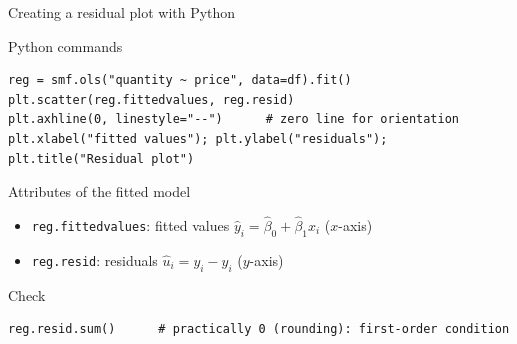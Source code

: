 \documentclass[aspectratio=169,11pt]{beamer}
\begin{document}
\begin{frame}[fragile]{Creating a residual plot with Python}
  \vspace{-8pt}
  \begin{block}{Python commands}
\begin{lstlisting}
reg = smf.ols("quantity ~ price", data=df).fit()
plt.scatter(reg.fittedvalues, reg.resid)
plt.axhline(0, linestyle="--")      # zero line for orientation
plt.xlabel("fitted values"); plt.ylabel("residuals"); plt.title("Residual plot")
\end{lstlisting}
  \end{block}
  \vspace{-5pt}
  \begin{block}{Attributes of the fitted model}
    \begin{itemize}
      \item \texttt{reg.fittedvalues}: fitted values
            $\hat{y}_i = \hat{\beta}_0 + \hat{\beta}_1 x_i$ ($x$-axis)
      \item \texttt{reg.resid}: residuals
            $\hat{u}_i = y_i - \hat{y}_i$ ($y$-axis)
    \end{itemize}
  \end{block}
  \vspace{-5pt}
  \begin{exampleblock}{Check}
\begin{lstlisting}
reg.resid.sum()      # practically 0 (rounding): first-order condition
\end{lstlisting}
  \end{exampleblock}
\end{frame}
\end{document}
